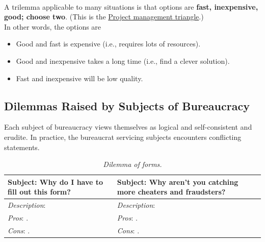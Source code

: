 \ \\

A trilemma applicable to many situations is that options are \textbf{fast, inexpensive, good; choose two}. (This is the \href{https://en.wikipedia.org/wiki/Project_management_triangle}{Project management triangle}.) \\
In other words, the options are
\begin{itemize}
    \item Good and fast is expensive (i.e., requires lots of resources).
    \item Good and inexpensive takes a long time (i.e., find a clever solution).
    \item Fast and inexpensive will be low quality.
\end{itemize}

\subsection*{Dilemmas Raised by Subjects of Bureaucracy\label{sec:subjects_dilemmas}}

Each subject of bureaucracy views themselves as logical and self-consistent and erudite. In practice, the bureaucrat servicing subjects encounters conflicting statements. 

\begin{center}
\begin{table}[H] %
\begin{tabular}{ | m{\dilemmatablewidth}| m{\dilemmatablewidth} | } 
  \hline
  \textbf{Subject: Why do I have to fill out this form?} &
  \textbf{Subject: Why aren't you catching more cheaters and fraudsters?} \\
  \hline
  \textit{Description}:  & 
  \textit{Description}:  \\
  \hline
  \textit{Pros}: . & 
  \textit{Pros}: . \\
  \hline
  \textit{Cons}: . & 
  \textit{Cons}: . \\
  \hline
\end{tabular}
\caption{\textit{Dilemma of forms.}
}
\label{table:dilemma-forms}
\end{table}
\end{center}

\ \\

